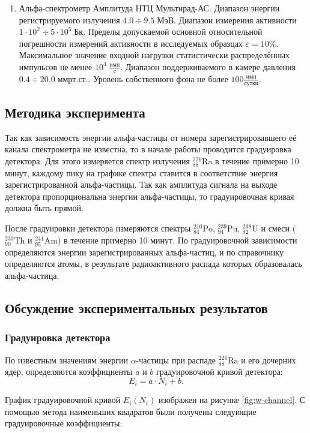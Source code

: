 \documentclass[10pt,a4paper]{article}
\newcommand{\mmhg}[1][\;]{#1 мм рт.ст.}
\newcommand{\Bk}[1][\;]{#1 Бк}
\newcommand{\MeV}[1][\;]{#1 МэВ}
\newcommand{\elem}[3]{{}^{#2}_{#3}\text{#1}}
\newcommand{\Ra}{\elem{Ra}{226}{88}}
\newcommand{\Pu}{\elem{Pu}{239}{94}}
\newcommand{\Po}{\elem{Po}{210}{84}}
\newcommand{\Ua}{\elem{U}{238}{92}}
\newcommand{\Th}{\elem{Th}{230}{90}}
\newcommand{\Am}{\elem{Am}{241}{95}}
\begin{document}
\begin{multicols}{2}
\begin{enumerate}
		\item Альфа-спектрометр Амплитуда НТЦ Мультирад-АС. Диапазон энергии регистрируемого излучения $4.0 \div 9.5 \MeV$. Диапазон измерения активности $1 \cdot 10^2 \div 5 \cdot 10^5 \Bk$. Пределы допускаемой основной относительной погрешности измерений активности в исследуемых образцах $\varepsilon = 10 \%$. Максимальное значение входной нагрузки статистически распределённых импульсов не менее $10^4 \; \frac{имп}{с}$. Диапазон поддерживаемого в камере давления $0.4 \div 20.0 \mmhg$. Уровень собственного фона не более $100 \frac{имп}{сутки}$.
	\end{enumerate}
	
	\subsection*{Методика эксперимента}
	
	Так как зависимость энергии альфа-частицы от номера зарегистрировавшего её канала спектрометра не известна, то в начале работы проводится градуировка детектора. Для этого измеряется спектр излучения $\Ra$ в течение примерно 10 минут, каждому пику на графике спектра ставится в соответствие энергия зарегистрированной альфа-частицы. Так как амплитуда сигнала на выходе детектора пропорциональна энергии альфа-частицы, то градуировочная кривая должна быть прямой.
	
	После градуировки детектора измеряются спектры $\Po$, $\Pu$, $\Ua$ и смеси ($\Th$ и $\Am$) в течение примерно 10 минут. По градуировочной зависимости определяются энергии зарегистрированных альфа-частиц, и по справочнику определяются атомы, в результате радиоактивного распада которых образовалась альфа-частица.
	
	\subsection*{Обсуждение экспериментальных результатов}
	
	\subsubsection*{Градуировка детектора}
	По известным значениям энергии $\alpha$-частицы при распаде $\Ra$ и его дочерних ядер, определяются коэффициенты $a$ и $b$ градуировочной кривой детектора:
	$$
	E_i = a\cdot N_i + b.
	$$
	
	График градуировочной кривой $E_i(N_i)$ изображен на рисунке \ref{fig:w-channel}. С помощью метода наименьших квадратов были получены следующие градуировочные коэффициенты:
	

\end{multicols}
\end{document}
